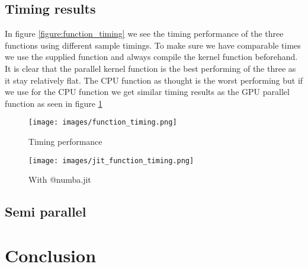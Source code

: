 \newpage

\subsection{Timing results}
\label{subsec:timing results}

In figure \ref{figure:function_timing} we see the timing performance of the three functions using different sample timings. To make sure we have comparable times we use the supplied  function and always compile the kernel function beforehand. It is clear that the parallel kernel function is the best performing of the three as it stay relatively flat.
The CPU function as thought is the worst performing but if we use  for the CPU function we get similar timing results as the GPU parallel function as seen in figure \ref{figure:jit_function_timing}

\begin{figure}[!htb]
    \centering
    \begin{minipage}[t]{0.45\linewidth}
        \texttt{[image: images/function\_timing.png]}
        \caption{Timing performance}
        \label{figure:function_timing}
    \end{minipage}
    \begin{minipage}[t]{0.45\linewidth}
        \texttt{[image: images/jit\_function\_timing.png]}
        \caption{With @numba.jit}
        \label{figure:jit_function_timing}
    \end{minipage}
\end{figure}

\subsection{Semi parallel}
\label{subsec:semiparallel}

\section{Conclusion}
\label{sec:conclusion}

